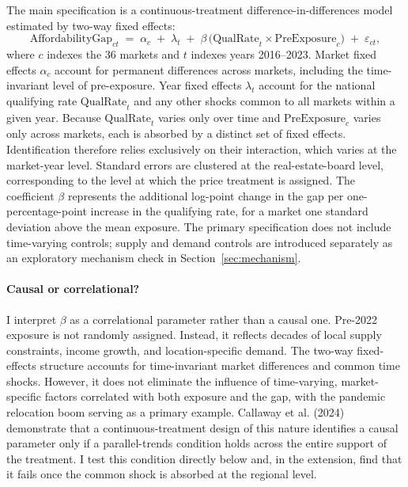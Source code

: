 \documentclass[12pt]{article}
\begin{document}
The main specification is a continuous-treatment difference-in-differences model estimated by two-way fixed effects:
\begin{equation}
\text{AffordabilityGap}_{ct} \;=\; \alpha_c \;+\; \lambda_t \;+\; \beta\,\big(\text{QualRate}_t \times \text{PreExposure}_c\big) \;+\; \varepsilon_{ct},
\label{eq:main}
\end{equation}
where $c$ indexes the 36 markets and $t$ indexes years 2016--2023. Market fixed effects $\alpha_c$ account for permanent differences across markets, including the time-invariant level of pre-exposure. Year fixed effects $\lambda_t$ account for the national qualifying rate $\text{QualRate}_t$ and any other shocks common to all markets within a given year. Because $\text{QualRate}_t$ varies only over time and $\text{PreExposure}_c$ varies only across markets, each is absorbed by a distinct set of fixed effects. Identification therefore relies exclusively on their interaction, which varies at the market-year level. Standard errors are clustered at the real-estate-board level, corresponding to the level at which the price treatment is assigned. The coefficient $\beta$ represents the additional log-point change in the gap per one-percentage-point increase in the qualifying rate, for a market one standard deviation above the mean exposure. The primary specification does not include time-varying controls; supply and demand controls are introduced separately as an exploratory mechanism check in Section~\ref{sec:mechanism}.


\paragraph{Causal or correlational?} I interpret $\beta$ as a correlational parameter rather than a causal one. Pre-2022 exposure is not randomly assigned. Instead, it reflects decades of local supply constraints, income growth, and location-specific demand. The two-way fixed-effects structure accounts for time-invariant market differences and common time shocks. However, it does not eliminate the influence of time-varying, market-specific factors correlated with both exposure and the gap, with the pandemic relocation boom serving as a primary example. Callaway et al. (2024) demonstrate that a continuous-treatment design of this nature identifies a causal parameter only if a parallel-trends condition holds across the entire support of the treatment. I test this condition directly below and, in the extension, find that it fails once the common shock is absorbed at the regional level.
\end{document}
